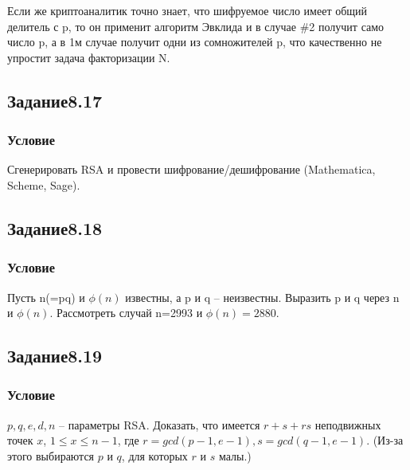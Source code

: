 \documentclass[10pt,a4paper]{article}
\begin{document}
Если же криптоаналитик точно знает, что шифруемое число имеет общий
делитель с p, то он применит алгоритм Эвклида и в случае \#2 получит
само число p, а в 1м случае получит одни из сомножителей p, что
качественно не упростит задача факторизации N.

\subsection*{Задание8.17}
\subsubsection*{Условие}
Сгенерировать RSA и провести шифрование/дешифрование (Mathematica,
Scheme, Sage). 

\subsection*{Задание8.18}
\subsubsection*{Условие}
Пусть n(=pq) и $\phi(n)$ известны, а p и q -- неизвестны. Выразить p и
q через n и $\phi(n)$. Рассмотреть случай n=2993 и $\phi(n)=2880$.

\subsection*{Задание8.19}
\subsubsection*{Условие}
$p,q,e,d,n$ -- параметры RSA.  Доказать, что имеется $r+s+rs$
неподвижных точек $x$, $1\leq x\leq n-1$, где $r=gcd(p-1,e-1),
s=gcd(q-1,e-1)$. (Из-за этого выбираются $p$ и $q$, для которых $r$ и
$s$ малы.) 
\end{document}
